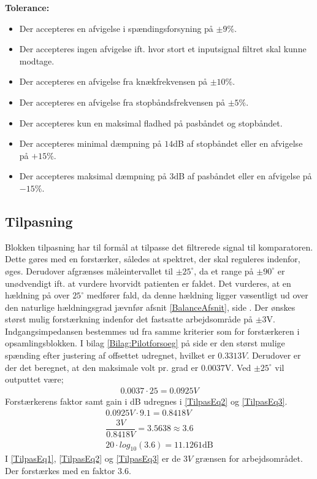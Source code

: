 \textbf{Tolerance:}
\begin{itemize}
	\item Der accepteres en afvigelse i spændingsforsyning på $\pm9\%$.
	\item Der accepteres ingen afvigelse ift. hvor stort et inputsignal filtret skal kunne modtage.
	\item Der accepteres en afvigelse fra knækfrekvensen på $\pm10\%$.
	\item Der accepteres en afvigelse fra stopbåndsfrekvensen på $\pm5\%$.
	\item Der accepteres kun en maksimal fladhed på pasbåndet og stopbåndet.
	\item Der accepteres minimal dæmpning på $14$dB af stopbåndet eller en afvigelse på $+15\%$.
	\item Der accepteres maksimal dæmpning på $3$dB af pasbåndet eller en afvigelse på $-15\%$.
\end{itemize}
\subsection{Tilpasning}\label{Tilpasningsblok}
Blokken tilpasning har til formål at tilpasse det filtrerede signal til komparatoren. Dette gøres med en forstærker, således at spektret, der skal reguleres indenfor, øges. Derudover afgrænses måleintervallet til $\pm25^{\circ}$, da et range på $\pm90^{\circ}$ er unødvendigt ift. at vurdere hvorvidt patienten er faldet. Det vurderes, at en hældning på over $25^{\circ}$ medfører fald, da denne hældning ligger væsentligt ud over den naturlige hældningsgrad jævnfør afsnit \ref{BalanceAfsnit}, side \pageref{BalanceAfsnit}. Der ønskes størst mulig forstærkning indenfor det fastsatte arbejdsområde på $\pm3$V. Indgangsimpedansen bestemmes ud fra samme kriterier som for forstærkeren i opsamlingsblokken. I bilag \ref{Bilag:Pilotforsoeg} på side \pageref{Bilag:Pilotforsoeg} er den størst mulige spænding efter justering af offsettet udregnet, hvilket er $0.3313V$. Derudover er der det beregnet, at den maksimale volt pr. grad er $0.0037$V. Ved $\pm25^{\circ}$ vil outputtet være;
\begin{align}
\label{Udreg3} 0.0037 \cdot 25 = 0.0925V
\end{align}
Forstærkerens faktor samt gain i dB udregnes i \eqref{TilpasEq2} og \eqref{TilpasEq3}.
\begin{align}
\label{TilpasEq1} 0.0925V \cdot 9.1 = 0.8418V \\
\label{TilpasEq2} \dfrac{3V}{0.8418V} = 3.5638 \approx 3.6 \\
\label{TilpasEq3} 20 \cdot log_{10} (3.6) = 11.1261\text{dB}
\end{align} 
I \eqref{TilpasEq1}, \eqref{TilpasEq2} og \eqref{TilpasEq3} er de $3V$ grænsen for arbejdsområdet. Der forstærkes med en faktor $3.6$. \\


